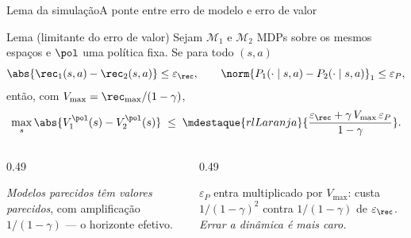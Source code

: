 \documentclass[aspectratio=169, 11pt]{beamer}
\newcommand{\Vmax}{V_{\max}}
\newcommand{\Mdp}{\mathcal{M}}
\begin{document}
\begin{frame}{Lema da simulação}{A ponte entre erro de modelo e erro de valor}
  \begin{teobox}{Lema (limitante do erro de valor)}
    Sejam $\Mdp_1$ e $\Mdp_2$ MDPs sobre os mesmos espaços e $\pol$ uma política fixa.
    Se para todo $(s,a)$
    \[
      \abs{\rec_1(s,a) - \rec_2(s,a)} \le \varepsilon_{\rec},
      \qquad
      \norm{P_1(\cdot\mid s,a) - P_2(\cdot \mid s,a)}_1 \le \varepsilon_{P},
    \]
    então, com $\Vmax = \rec_{\max}/(1-\gamma)$,
    \[
      \max_{s} \abs{V_1^{\pol}(s) - V_2^{\pol}(s)}
      \;\le\;
      \mdestaque{rlLaranja}{\frac{\varepsilon_{\rec} + \gamma\,\Vmax\,\varepsilon_{P}}{1-\gamma}} .
    \]
  \end{teobox}
  \begin{columns}[T]
    \begin{column}{0.49\textwidth}
      \begin{ideiabox}
        \emph{Modelos parecidos têm valores parecidos}, com amplificação $1/(1-\gamma)$
        --- o horizonte efetivo.
      \end{ideiabox}
    \end{column}
    \begin{column}{0.49\textwidth}
      \begin{alertabox}
        $\varepsilon_P$ entra multiplicado por $\Vmax$: custa $1/(1-\gamma)^2$ contra
        $1/(1-\gamma)$ de $\varepsilon_{\rec}$. \emph{Errar a dinâmica é mais caro.}
      \end{alertabox}
    \end{column}
  \end{columns}
\end{frame}
\end{document}
